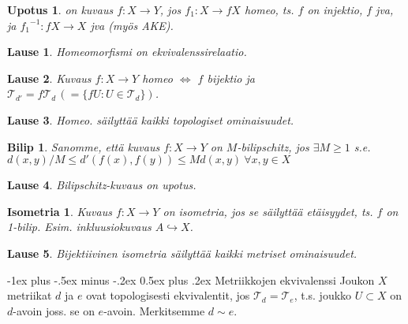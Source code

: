 \documentclass[landscape,a4paper,9pt]{extarticle}
\makeatletter
\renewcommand{\section}{\@startsection{section}{1}{0mm}%
                                {-1ex plus -.5ex minus -.2ex}%
                                {0.5ex plus .2ex}%
                                {\color{blue}\normalfont\large\bfseries}}
\theoremstyle{customtheoremstyle}
\newtheorem*{theorem}{Lause}
\makeatother
\begin{document}
\begin{multicols*}{3}
\newtheorem*{defn:upotus}{Upotus}
\begin{defn:upotus}
  on kuvaus $f: X \rightarrow Y$, jos $f_1 : X \rightarrow f X$ homeo, ts. $f$
  on injektio, $f$ jva, ja ${f_1}^{-1}: f X \rightarrow X$ jva (myös AKE).
\end{defn:upotus}

\begin{theorem}
  Homeomorfismi on ekvivalenssirelaatio.
\end{theorem}

\begin{theorem}
  Kuvaus $f: X \rightarrow Y$ homeo $\iff$ $f$ bijektio ja $\mathcal{T}_{d'} =
  f \mathcal{T}_d \,(= \{ f U : U \in \mathcal{T}_d \})$.
\end{theorem}

\begin{theorem}
  Homeo. säilyttää kaikki topologiset ominaisuudet.
\end{theorem}

\newtheorem*{defn:bilip}{Bilip}
\begin{defn:bilip}
  Sanomme, että kuvaus $f: X \rightarrow Y$ on $M$-bilipschitz, jos
  $\exists M \geq 1$ s.e.
  $
  d(x,y) / M \leq d'(f(x), f(y)) \leq M d(x,y) \: \forall x,y \in X
  $
\end{defn:bilip}

\begin{theorem}
  Bilipschitz-kuvaus on upotus.
\end{theorem}

\newtheorem*{defn:isometria}{Isometria}
\begin{defn:isometria}
  Kuvaus $f: X \rightarrow Y$ on isometria, jos se säilyttää etäisyydet, ts.
  $f$ on 1-bilip. Esim. inkluusiokuvaus $A \hookrightarrow X$.
\end{defn:isometria}

\begin{theorem}
  Bijektiivinen isometria säilyttää kaikki metriset ominaisuudet.
\end{theorem}

\section{Metriikkojen ekvivalenssi}
Joukon $X$ metriikat $d$ ja $e$ ovat topologisesti ekvivalentit, jos
$\mathcal{T}_d = \mathcal{T}_e$, t.s. joukko $U \subset X$ on $d$-avoin joss.
se on $e$-avoin. Merkitsemme $d \sim e$.


\end{multicols*}
\end{document}
